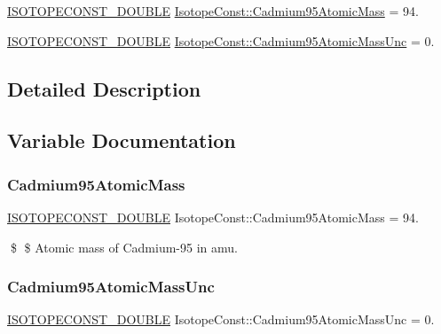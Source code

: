 \begin{DoxyCompactItemize}
\item 
\mbox{\hyperlink{group___isotope_const-_macros_ga8f45a7272ce02c0b4c65c44636ed719a}{I\+S\+O\+T\+O\+P\+E\+C\+O\+N\+S\+T\+\_\+\+D\+O\+U\+B\+LE}} \mbox{\hyperlink{group___isotope_const-_cadmium-_cd95_gad49fee8d365ab0f895bc7c2d62df4f1b}{Isotope\+Const\+::\+Cadmium95\+Atomic\+Mass}} = 94.
\item 
\mbox{\hyperlink{group___isotope_const-_macros_ga8f45a7272ce02c0b4c65c44636ed719a}{I\+S\+O\+T\+O\+P\+E\+C\+O\+N\+S\+T\+\_\+\+D\+O\+U\+B\+LE}} \mbox{\hyperlink{group___isotope_const-_cadmium-_cd95_ga3b75d7943862dcbb58b0caca9ae948ec}{Isotope\+Const\+::\+Cadmium95\+Atomic\+Mass\+Unc}} = 0.
\end{DoxyCompactItemize}


\subsection{Detailed Description}


\subsection{Variable Documentation}
\mbox{\label{group___isotope_const-_cadmium-_cd95_gad49fee8d365ab0f895bc7c2d62df4f1b}} 
\subsubsection{\texorpdfstring{Cadmium95\+Atomic\+Mass}{Cadmium95AtomicMass}}
{\footnotesize\ttfamily \mbox{\hyperlink{group___isotope_const-_macros_ga8f45a7272ce02c0b4c65c44636ed719a}{I\+S\+O\+T\+O\+P\+E\+C\+O\+N\+S\+T\+\_\+\+D\+O\+U\+B\+LE}} Isotope\+Const\+::\+Cadmium95\+Atomic\+Mass = 94.}

\$ \$ Atomic mass of Cadmium-\/95 in amu. \mbox{\label{group___isotope_const-_cadmium-_cd95_ga3b75d7943862dcbb58b0caca9ae948ec}} 
\subsubsection{\texorpdfstring{Cadmium95\+Atomic\+Mass\+Unc}{Cadmium95AtomicMassUnc}}
{\footnotesize\ttfamily \mbox{\hyperlink{group___isotope_const-_macros_ga8f45a7272ce02c0b4c65c44636ed719a}{I\+S\+O\+T\+O\+P\+E\+C\+O\+N\+S\+T\+\_\+\+D\+O\+U\+B\+LE}} Isotope\+Const\+::\+Cadmium95\+Atomic\+Mass\+Unc = 0.}

